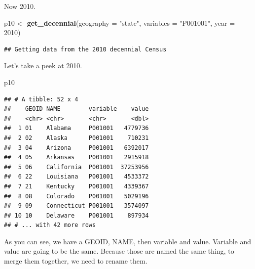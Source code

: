 \documentclass[]{book}
\newenvironment{Shaded}{\begin{snugshade}}{\end{snugshade}}
\newcommand{\DataTypeTok}[1]{\textcolor[rgb]{0.13,0.29,0.53}{#1}}
\newcommand{\DecValTok}[1]{\textcolor[rgb]{0.00,0.00,0.81}{#1}}
\newcommand{\KeywordTok}[1]{\textcolor[rgb]{0.13,0.29,0.53}{\textbf{#1}}}
\newcommand{\NormalTok}[1]{#1}
\newcommand{\OperatorTok}[1]{\textcolor[rgb]{0.81,0.36,0.00}{\textbf{#1}}}
\newcommand{\StringTok}[1]{\textcolor[rgb]{0.31,0.60,0.02}{#1}}
\begin{document}
Now 2010.

\begin{Shaded}
\begin{Highlighting}[]
\NormalTok{p10 <-}\StringTok{ }\KeywordTok{get_decennial}\NormalTok{(}\DataTypeTok{geography =} \StringTok{"state"}\NormalTok{, }\DataTypeTok{variables =} \StringTok{"P001001"}\NormalTok{, }\DataTypeTok{year =} \DecValTok{2010}\NormalTok{)}
\end{Highlighting}
\end{Shaded}

\begin{verbatim}
## Getting data from the 2010 decennial Census
\end{verbatim}

Let's take a peek at 2010.

\begin{Shaded}
\begin{Highlighting}[]
\NormalTok{p10}
\end{Highlighting}
\end{Shaded}

\begin{verbatim}
## # A tibble: 52 x 4
##    GEOID NAME        variable    value
##    <chr> <chr>       <chr>       <dbl>
##  1 01    Alabama     P001001   4779736
##  2 02    Alaska      P001001    710231
##  3 04    Arizona     P001001   6392017
##  4 05    Arkansas    P001001   2915918
##  5 06    California  P001001  37253956
##  6 22    Louisiana   P001001   4533372
##  7 21    Kentucky    P001001   4339367
##  8 08    Colorado    P001001   5029196
##  9 09    Connecticut P001001   3574097
## 10 10    Delaware    P001001    897934
## # ... with 42 more rows
\end{verbatim}

As you can see, we have a GEOID, NAME, then variable and value. Variable and value are going to be the same. Because those are named the same thing, to merge them together, we need to rename them.

\begin{Shaded}
\end{Shaded}
\end{document}
